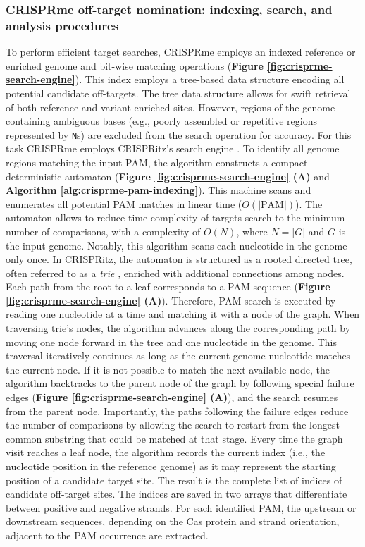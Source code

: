 \documentclass[a4paper, titlepage, openright]{book}
\newcommand{\crisprme}{CRISPRme\xspace}
\begin{document}
\subsubsection{\crisprme off-target nomination: indexing, search, and analysis procedures}
To perform efficient target searches, \crisprme employs an indexed reference or enriched genome and bit-wise matching operations (\textbf{Figure \ref{fig:crisprme-search-engine}}). This index employs a tree-based data structure encoding all potential candidate off-targets. The tree data structure allows for swift retrieval of both reference and variant-enriched sites. However, regions of the genome containing ambiguous bases (e.g., poorly assembled or repetitive regions represented by \texttt{N}s) are excluded from the search operation for accuracy. For this task \crisprme employs CRISPRitz's search engine \citep{cancellieri2020crispritz}. To identify all genome regions matching the input PAM, the algorithm constructs a compact deterministic automaton (\textbf{Figure \ref{fig:crisprme-search-engine} (A)} and \textbf{Algorithm \ref{alg:crisprme-pam-indexing}}). This machine scans and enumerates all potential PAM matches in linear time ($O(|\text{PAM}|)$). The automaton allows to reduce time complexity of targets search to the minimum number of comparisons, with a complexity of $O(N)$, where $N=|G|$ and $G$ is the input genome. Notably, this algorithm scans each nucleotide in the genome only once. In CRISPRitz, the automaton is structured as a rooted directed tree, often referred to as a \emph{trie} \citep{bodon2003trie}, enriched with additional connections among nodes. Each path from the root to a leaf corresponds to a PAM sequence (\textbf{Figure \ref{fig:crisprme-search-engine} (A)}). Therefore, PAM search is executed by reading one nucleotide at a time and matching it with a node of the graph. When traversing trie's nodes, the algorithm advances along the corresponding path by moving one node forward in the tree and one nucleotide in the genome. This traversal iteratively continues as long as the current genome nucleotide matches the current node. If it is not possible to match the next available node, the algorithm backtracks to the parent node of the graph by following special failure edges (\textbf{Figure \ref{fig:crisprme-search-engine} (A)}), and the search resumes from the parent node. Importantly, the paths following the failure edges reduce the number of comparisons by allowing the search to restart from the longest common substring that could be matched at that stage. Every time the graph visit reaches a leaf node, the algorithm records the current index (i.e., the nucleotide position in the reference genome) as it may represent the starting position of a candidate target site. The result is the complete list of indices of candidate off-target sites. The indices are saved in two arrays that differentiate between positive and negative strands. For each identified PAM, the upstream or downstream sequences, depending on the Cas protein and strand orientation, adjacent to the PAM occurrence are extracted. 
\end{document}
